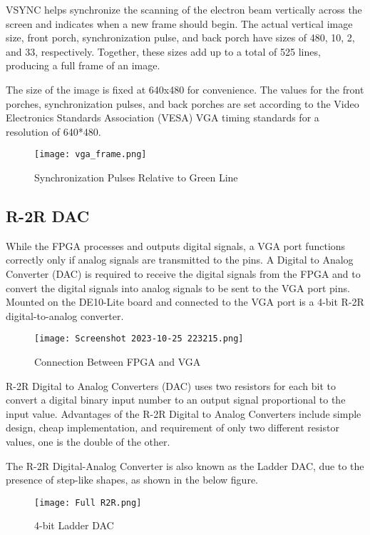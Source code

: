 \par VSYNC helps synchronize the scanning of the electron beam vertically across the screen and indicates when a new frame should begin. The actual vertical image size, front porch, synchronization pulse, and back porch have sizes of 480, 10, 2, and 33, respectively. Together, these sizes add up to a total of 525 lines, producing a full frame of an image. \newline
\par The size of the image is fixed at 640x480 for convenience. The values for the front porches, synchronization pulses, and back porches are set according to the Video Electronics Standards Association (VESA) VGA timing standards for a resolution of 640*480. \newline

\begin{figure}[H]
    \centering
    \texttt{[image: vga\_frame.png]}
    \caption{Synchronization Pulses Relative to Green Line \cite{figeight}}
    \label{fig:vgaSync}  
\end{figure}

\subsection{R-2R DAC}
\par While the FPGA processes and outputs digital signals, a VGA port functions correctly only if analog signals are transmitted to the pins. A Digital to Analog Converter (DAC) is required to receive the digital signals from the FPGA and to convert the digital signals into analog signals to be sent to the VGA port pins. Mounted on the DE10-Lite board and connected to the VGA port is a 4-bit R-2R digital-to-analog converter. \newline

\begin{figure}[H]
	\centering
	\texttt{[image: Screenshot 2023-10-25 223215.png]}
	\caption{Connection Between FPGA and VGA \cite{figfour}}
	\label{fig:fpga2vga}  
\end{figure}

\par R-2R Digital to Analog Converters (DAC) uses two resistors for each bit to convert a digital binary input number to an output signal proportional to the input value. Advantages of the R-2R Digital to Analog Converters include simple design, cheap implementation, and requirement of only two different resistor values, one is the double of the other.\newline
\par The R-2R Digital-Analog Converter is also known as the Ladder DAC, due to the presence of step-like shapes, as shown in the below figure. \newline
\begin{figure}[H]
    \centering
    \texttt{[image: Full R2R.png]}
    \caption{4-bit Ladder DAC}
    \label{fig:R2R}  
\end{figure}

